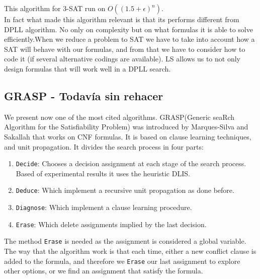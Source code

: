 This algorithm for $3$-SAT run on $O((1.5 + \epsilon)^n)$\cite{dantsin2000deterministic}.\\


In fact what made this algorithm relevant is that its performs different from DPLL algorithm. No only on complexity but on what formulas it is able to solve efficiently.When we reduce a problem to SAT we have to take into account how a SAT will behave with our formulas, and from that we have to consider how to code it (if several alternative codings are available). LS allows us to not only design formulas that will work well in a DPLL search. \\


  
\subsection{GRASP - Todavía sin rehacer }
\label{sub:grasp}
We present now one of the most cited algorithms.  GRASP(Generic seaRch Algorithm for the Satisfiability Problem) was introduced by Marques-Silva and Sakallah\cite{marques1999grasp} that works on CNF formulas. It is based on clause learning techniques, and unit propagation. It divides the search process in four parts:

\begin{enumerate}
\item \texttt{Decide}: Chooses a decision assignment at each stage of the search process. Based of experimental results it uses the heuristic DLIS.
\item \texttt{Deduce}: Which implement a recursive unit propagation as done before.
\item \texttt{Diagnose}: Which implement a clause learning procedure.
\item \texttt{Erase}: Which delete assignments implied by the last decision.
\end{enumerate}


The method \texttt{Erase} is needed as the assignment is considered a global variable. The way that the algorithm work is that each time, either a new conflict clause is added to the formula, and therefore we \texttt{Erase} our last assignment to explore other options, or we find an assignment that satisfy the formula.


